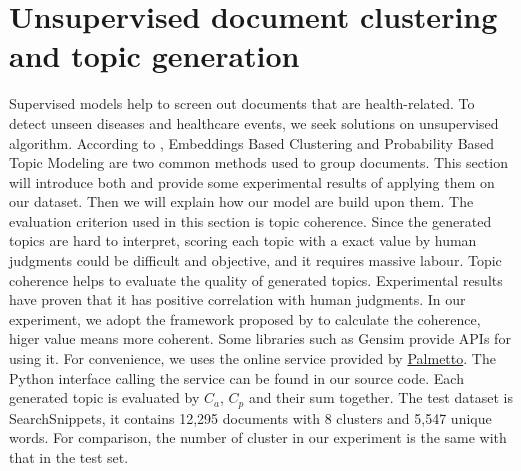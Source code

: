 \section{Unsupervised document clustering and topic generation}
\label{sec:unsupervised}
Supervised models help to screen out documents that are health-related. To detect unseen diseases and healthcare events, we seek solutions on unsupervised algorithm. According to \cite{allahyari2017brief}, Embeddings Based Clustering and Probability Based Topic Modeling are two common methods used to group documents. This section will introduce both and provide some experimental results of applying them on our dataset. Then we will explain how our model are build upon them. The evaluation criterion used in this section is topic coherence. Since the generated topics are hard to interpret, scoring each topic with a exact value by human judgments could be difficult and objective, and it requires massive labour. Topic coherence helps to evaluate the quality of generated topics. Experimental results have proven that it has positive correlation with human judgments. In our experiment, we adopt the framework proposed by \cite{roder2015exploring} to calculate the coherence, higer value means more coherent. Some libraries such as Gensim provide APIs for using it. For convenience, we uses the online service provided by \href{https://palmetto.demos.dice-research.org/}{Palmetto}. The Python interface calling the service can be found in our source code. Each generated topic is evaluated by $C_a$, $C_p$ and their sum together. The test dataset is SearchSnippets, it contains 12,295 documents with 8 clusters and 5,547 unique words. For comparison, the number of cluster in our experiment is the same with that in the test set. 

